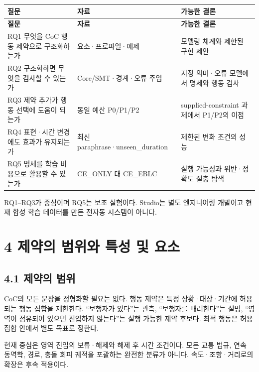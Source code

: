 \documentclass[11pt,a4paper]{article}
\begin{document}
\begingroup\small
\begin{longtable}{@{}>{\raggedright\arraybackslash}p{}>{\raggedright\arraybackslash}p{}>{\raggedright\arraybackslash}p{}@{}}
\toprule
\textbf{질문} & \textbf{자료} & \textbf{가능한 결론} \\
\midrule\endfirsthead
\toprule
\textbf{질문} & \textbf{자료} & \textbf{가능한 결론} \\
\midrule\endhead
\bottomrule\endfoot
RQ1 무엇을 CoC 행동 제약으로 구조화하는가 & 요소·프로파일·예제 & 모델링 체계와 제한된 구현 제안 \\
RQ2 구조화하면 무엇을 검사할 수 있는가 & Core/SMT·경계·오류 주입 & 지정 의미·오류 모델에서 명세와 행동 검사 \\
RQ3 제약 추가가 행동 선택에 도움이 되는가 & 동일 예산 P0/P1/P2 & supplied-constraint 과제에서 P1/P2의 이점 \\
RQ4 표현·시간 변경에도 효과가 유지되는가 & 최신 paraphrase·unseen\_\allowbreak{}duration & 제한된 변화 조건의 성능 \\
RQ5 명세를 학습 비용으로 활용할 수 있는가 & CE\_\allowbreak{}ONLY 대 CE\_\allowbreak{}EBLC & 실행 가능성과 위반·정확도 절충 탐색 \\
\end{longtable}
\endgroup

RQ1–RQ3가 중심이며 RQ5는 보조 실험이다. Studio는 별도 엔지니어링 개발이고 현재 합성 학습 데이터를 만든 전자동 시스템이 아니다.\par

\clearpage{}\section*{4 제약의 범위와 특성 및 요소}

\subsection*{4.1 제약의 범위}

CoC의 모든 문장을 정형화할 필요는 없다. 행동 제약은 특정 상황·대상·기간에 허용되는 행동 집합을 제한한다. “보행자가 있다”는 관측, “보행자를 배려한다”는 설명, “영역이 점유되어 있으면 진입하지 않는다”는 실행 가능한 제약 후보다. 최적 행동은 허용 집합 안에서 별도 목표로 정한다.\par

현재 중심은 영역 진입의 보류·해제와 해제 후 시간 조건이다. 모든 교통 법규, 연속 동역학, 경로, 충돌 회피 궤적을 포괄하는 완전한 분류가 아니다. 속도·조향·거리로의 확장은 후속 적용이다.\par
\end{document}
